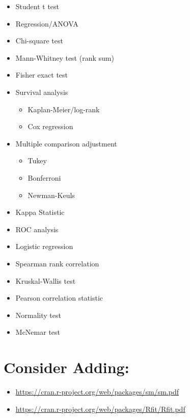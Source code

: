 \documentclass[
]{article}
\providecommand{\tightlist}{%
  \setlength{\itemsep}{0pt}\setlength{\parskip}{0pt}}
\begin{document}
\begin{itemize}
\tightlist
\item
  Student t test
\item
  Regression/ANOVA
\item
  Chi-square test
\item
  Mann-Whitney test (rank sum)
\item
  Fisher exact test
\item
  Survival analysis

  \begin{itemize}
  \tightlist
  \item
    Kaplan-Meier/log-rank
  \item
    Cox regression
  \end{itemize}
\item
  Multiple comparison adjustment

  \begin{itemize}
  \tightlist
  \item
    Tukey
  \item
    Bonferroni
  \item
    Newman-Keuls
  \end{itemize}
\item
  Kappa Statistic
\item
  ROC analysis
\item
  Logistic regression
\item
  Spearman rank correlation
\item
  Kruskal-Wallis test
\item
  Pearson correlation statistic
\item
  Normality test
\item
  McNemar test
\end{itemize}

\hypertarget{consider-adding}{%
\section{Consider Adding:}\label{consider-adding}}

\begin{itemize}
\tightlist
\item
  \url{https://cran.r-project.org/web/packages/sm/sm.pdf}
\item
  \url{https://cran.r-project.org/web/packages/Rfit/Rfit.pdf}
\end{itemize}
\end{document}
